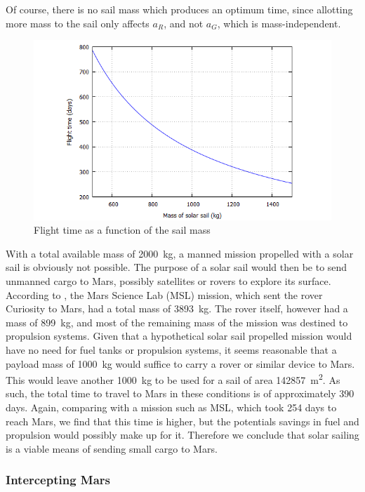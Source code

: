 \documentclass[twocolumn,12pt,a4paper]{article}
\numberwithin{equation}{section}
\begin{document}
Of course, there is no sail mass which produces an optimum time, since allotting more mass to the sail only affects \( a_R \), and not \( a_G \), which is mass-independent. 

\begin{figure}[b]
	\centering
	\includegraphics[scale=0.35]{time}
	\caption{Flight time as a function of the sail mass}
	\label{fig:time of flight}
\end{figure}

With a total available mass of \SI{2000}{kg}, a manned mission propelled with a solar sail is obviously not possible. The purpose of a solar sail would then be to send unmanned cargo to Mars, possibly satellites or rovers to explore its surface. According to \cite{presskit}, the Mars Science Lab (MSL) mission, which sent the rover Curiosity to Mars, had a total mass of \SI{3893}{kg}. The rover itself, however had a mass of \SI{899}{kg}, and most of the remaining mass of the mission was destined to propulsion systems. Given that a hypothetical solar sail propelled mission would have no need for fuel tanks or propulsion systems, it seems reasonable that a payload mass of \SI{1000}{kg} would suffice to carry a rover or similar device to Mars. This would leave another \SI{1000}{kg} to be used for a sail of area \SI{142857}{m^2}. As such, the total time to travel to Mars in these conditions is of approximately 390 days. Again, comparing with a mission such as MSL, which took 254 days to reach Mars, we find that this time is higher, but the potentials savings in fuel and propulsion would possibly make up for it. Therefore we conclude that solar sailing is a viable means of sending small cargo to Mars. 

\subsubsection{Intercepting Mars}
\end{document}
